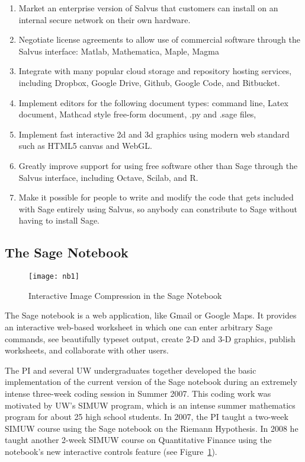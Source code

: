 \documentclass[11pt]{article}
\begin{document}
\begin{enumerate}
\item Market an enterprise version of Salvus that customers can
  install on an internal secure network on their own hardware.
\item Negotiate license agreements to allow use of commercial software
  through the Salvus interface: Matlab, Mathematica, Maple, Magma
\item Integrate with many popular cloud storage and repository hosting
  services, including Dropbox, Google Drive, Github, Google Code, and
  Bitbucket.
\item Implement editors for the following document types: command
  line, Latex document, Mathcad style free-form document, .py and
  .sage files,
\item Implement fast interactive 2d and 3d graphics using modern web
  standard such as HTML5 canvas and WebGL.
\item Greatly improve support for using free software other than Sage
  through the Salvus interface, including Octave, Scilab, and R.
\item Make it possible for people to write and modify the code that
  gets included with Sage entirely using Salvus, so anybody can
  constribute to Sage without having to install Sage.
\end{enumerate}


\subsection{The Sage Notebook}
\begin{figure}
\begin{center}
\texttt{[image: nb1]}
\caption{Interactive Image Compression in the Sage Notebook\label{fig:interact}}
\end{center}
\end{figure}
The Sage notebook is a web application, like Gmail or Google Maps.
It provides an interactive web-based worksheet in which one can enter
arbitrary Sage commands, see beautifully typeset output, create 2-D
and 3-D graphics, publish worksheets, and collaborate with other
users.

The PI and several UW undergraduates together developed the basic
implementation of the current version of the Sage notebook during an
extremely intense three-week coding session in Summer 2007.  This coding
work was motivated by UW's SIMUW program, which is an intense summer
mathematics program for about 25 high school students.  In 2007, the
PI taught a two-week SIMUW course using the Sage notebook on the Riemann
Hypothesis.  In 2008 he taught another 2-week SIMUW course on
Quantitative Finance using the notebook's new interactive controls
feature (see Figure~\ref{fig:interact}).
\end{document}
